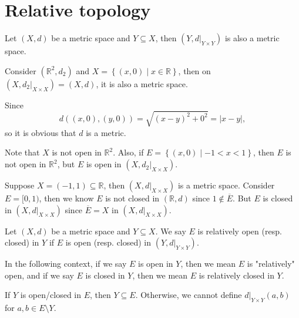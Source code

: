 \section{Relative topology}
Let \((X,d)\) be a metric space and \(Y \subseteq X\), then \(\left( Y, d\vert_{Y \times Y} \right) \) is also a metric space. 
\begin{eg}
    Consider \((\mathbb{R} ^2, d_2)\) and \(X = \left\{ (x, 0) \mid x \in \mathbb{R}  \right\} \), then on \(\left( X, d_2\vert_{X \times X} \right) = (X, d)\), it is also a metric space. 
\end{eg} 
\begin{explanation}
    Since 
    \[
        d((x,0),(y,0)) = \sqrt{(x-y)^2 + 0 ^2} = \vert x - y \vert, 
    \] so it is obvious that \(d\) is a metric. 
    
    Note that \(X\) is not open in \(\mathbb{R} ^2\). Also, if \(E = \left\{ (x, 0) \mid -1 < x < 1 \right\} \), then \(E\) is not open in \(\mathbb{R} ^2\), but \(E\) is open in \(\left( X, d_2 \vert_{X \times X} \right) \).       
\end{explanation}

\begin{eg}
    Suppose \(X = (-1, 1) \subseteq \mathbb{R} \), then \(\left( X, d \vert_{X \times X} \right) \) is a metric space. Consider \(E = [0, 1)\), then we know \(E\) is not closed in \((\mathbb{R} , d)\) since \(1 \notin \overline{E} \). But \(E\) is closed in \(\left( X, d\vert_{X \times X} \right) \) since \(\overline{E} = X\) in \((X, d\vert_{X \times X})\).          
\end{eg}

\begin{definition}
    Let \((X, d)\) be a metric space and \(Y \subseteq X\). We say \(E\) is relatively open (resp. closed) in \(Y\) if \(E\) is open (resp. closed) in \((Y, d\vert_{Y \times Y})\).     
\end{definition}

\begin{note}
    In the following context, if we say \(E\) is open in \(Y\), then we mean \(E\) is "relatively" open, and if we say \(E\) is closed in \(Y\), then we mean \(E\) is relatively closed in \(Y\).       
\end{note}

\begin{note}
    If \(Y\) is open/closed in \(E\), then \(Y \subseteq E\). Otherwise, we cannot define \(d\vert_{Y \times Y}(a, b)\) for \(a, b \in E\setminus Y\).     
\end{note}

